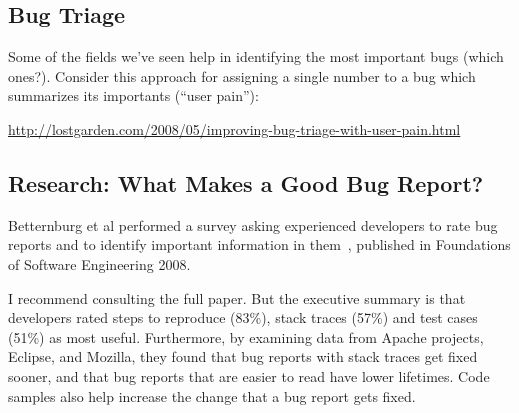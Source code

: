 \documentclass[11pt]{article}
\begin{document}
\subsection*{Bug Triage}
Some of the fields we've seen help in identifying the most
important bugs (which ones?). Consider this approach for 
assigning a single number to a bug which summarizes its
importants (``user pain''):

\begin{center}
\url{http://lostgarden.com/2008/05/improving-bug-triage-with-user-pain.html}
\end{center}

\subsection*{Research: What Makes a Good Bug Report?}
Betternburg et al performed a survey asking experienced developers to
rate bug reports and to identify important information in
them~\cite{bettenburg-fse-2008}, published in Foundations of Software
Engineering 2008.

I recommend consulting the full paper. But the executive summary is
that developers rated steps to reproduce (83\%), stack traces (57\%)
and test cases (51\%) as most useful. Furthermore, by examining data
from Apache projects, Eclipse, and Mozilla, they found that bug
reports with stack traces get fixed sooner, and that bug reports that
are easier to read have lower lifetimes. Code samples also help increase
the change that a bug report gets fixed.



\nocite{kaner:_bug_advoc}


\end{document}
